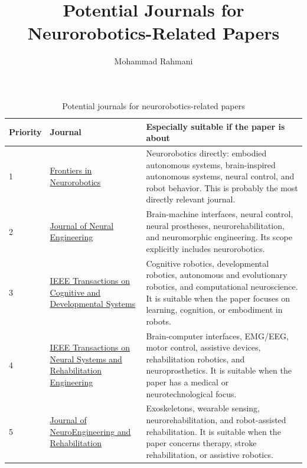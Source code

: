 \documentclass[a4paper]{article}
\title{Potential Journals for Neurorobotics-Related Papers}
\date{}
\author{Mohammad Rahmani}
\begin{document}
    \maketitle
    
    \renewcommand{\arraystretch}{1.25}
    
    \begin{table}[htbp]
        \centering
        \caption{Potential journals for neurorobotics-related papers}
        \label{tab:neurorobotics_journals}
        
        \begin{tabularx}{\textwidth}{p{} p{} X}
            \hline
            Priority & Journal & Especially suitable if the paper is about \\
            \hline
            
            1 &
            \href{https://www.frontiersin.org/journals/neurorobotics}{Frontiers in Neurorobotics} &
            Neurorobotics directly: embodied autonomous systems, brain-inspired autonomous systems, neural control, and robot behavior. This is probably the most directly relevant journal. \\
            
            2 &
            \href{https://iopscience.iop.org/journal/1741-2552}{Journal of Neural Engineering} &
            Brain-machine interfaces, neural control, neural prostheses, neurorehabilitation, and neuromorphic engineering. Its scope explicitly includes neurorobotics. \\
            
            3 &
            \href{https://cis.ieee.org/publications/t-cognitive-and-developmental-systems}{IEEE Transactions on Cognitive and Developmental Systems} &
            Cognitive robotics, developmental robotics, autonomous and evolutionary robotics, and computational neuroscience. It is suitable when the paper focuses on learning, cognition, or embodiment in robots. \\
            
            4 &
            \href{https://ieeexplore.ieee.org/xpl/RecentIssue.jsp?punumber=7333}{IEEE Transactions on Neural Systems and Rehabilitation Engineering} &
            Brain-computer interfaces, EMG/EEG, motor control, assistive devices, rehabilitation robotics, and neuroprosthetics. It is suitable when the paper has a medical or neurotechnological focus. \\
            
            5 &
            \href{https://link.springer.com/journal/12984}{Journal of NeuroEngineering and Rehabilitation} &
            Exoskeletons, wearable sensing, neurorehabilitation, and robot-assisted rehabilitation. It is suitable when the paper concerns therapy, stroke rehabilitation, or assistive robotics. \\
            

\end{tabularx}
\end{table}
\end{document}
